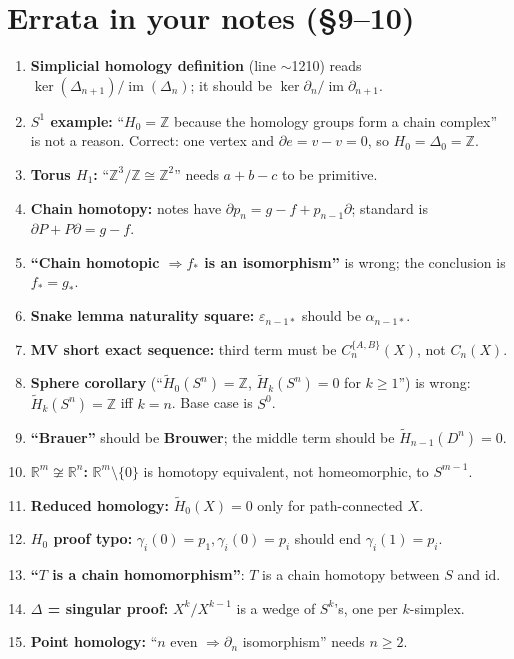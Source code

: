 \documentclass[11pt]{article}
\newcommand{\Z}{\mathbb Z}
\newcommand{\R}{\mathbb R}
\newcommand{\im}{\operatorname{im}}
\newcommand{\Hred}{\tilde H}
\theoremstyle{definition}
\begin{document}
\section{Errata in your notes (\S9--10)}
\begin{enumerate}
\item \textbf{Simplicial homology definition} (line $\sim$1210) reads\\ $\ker(\Delta_{n+1})/\im(\Delta_n)$; it should be $\ker\partial_n/\im\partial_{n+1}$.
\item \textbf{$S^1$ example:} ``$H_0=\Z$ because the homology groups form a chain complex'' is not a reason. Correct: one vertex and $\partial e=v-v=0$, so $H_0=\Delta_0=\Z$.
\item \textbf{Torus $H_1$:} ``$\Z^3/\Z\cong\Z^2$'' needs $a+b-c$ to be primitive.
\item \textbf{Chain homotopy:} notes have $\partial p_n=g-f+p_{n-1}\partial$; standard is $\partial P+P\partial=g-f$.
\item \textbf{``Chain homotopic $\Rightarrow f_*$ is an isomorphism''} is wrong; the conclusion is $f_*=g_*$.
\item \textbf{Snake lemma naturality square:} $\varepsilon_{n-1*}$ should be $\alpha_{n-1*}$.
\item \textbf{MV short exact sequence:} third term must be $C_n^{\{A,B\}}(X)$, not $C_n(X)$.
\item \textbf{Sphere corollary} (``$\Hred_0(S^n)=\Z$, $\Hred_k(S^n)=0$ for $k\ge1$'') is wrong: $\Hred_k(S^n)=\Z$ iff $k=n$. Base case is $S^0$.
\item \textbf{``Brauer''} should be \textbf{Brouwer}; the middle term should be $\Hred_{n-1}(D^n)=0$.
\item \textbf{$\R^m\not\cong\R^n$:} $\R^m\setminus\{0\}$ is homotopy equivalent, not homeomorphic, to $S^{m-1}$.
\item \textbf{Reduced homology:} $\Hred_0(X)=0$ only for path-connected $X$.
\item \textbf{$H_0$ proof typo:} $\gamma_i(0)=p_1,\gamma_i(0)=p_i$ should end $\gamma_i(1)=p_i$.
\item \textbf{``$T$ is a chain homomorphism''}: $T$ is a chain homotopy between $S$ and $\mathrm{id}$.
\item \textbf{$\Delta$ = singular proof:} $X^k/X^{k-1}$ is a wedge of $S^k$'s, one per $k$-simplex.
\item \textbf{Point homology:} ``$n$ even $\Rightarrow\partial_n$ isomorphism'' needs $n\ge2$.
\end{enumerate}
\end{document}
